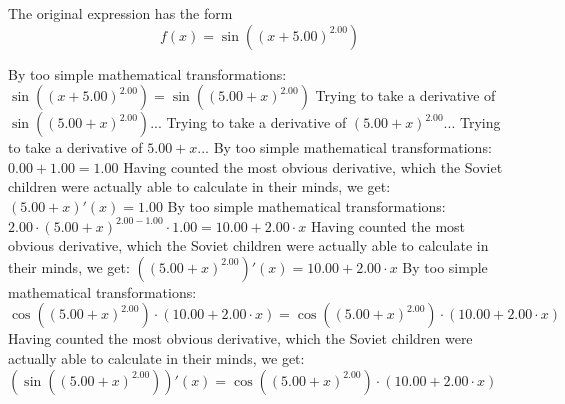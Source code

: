 \documentclass{article}
\begin{document}
                          
The original expression has the form \[f(x) =  \sin {\left({\left({{x} + {5.00}}\right) ^ {2.00}}\right)}  \]

By too simple mathematical transformations:
 $ \sin {\left({\left({{x} + {5.00}}\right) ^ {2.00}}\right)}  =  \sin {\left({\left({{5.00} + {x}}\right) ^ {2.00}}\right)} $ 
 \newline
 \newline 
Trying to take a derivative of $ \sin {\left({\left({{5.00} + {x}}\right) ^ {2.00}}\right)} $...\newline
\newline
Trying to take a derivative of ${\left({{5.00} + {x}}\right) ^ {2.00}}$...\newline
\newline
Trying to take a derivative of ${{5.00} + {x}}$...\newline
\newline
By too simple mathematical transformations:
 ${{0.00} + {1.00}} = {1.00}$ 
 \newline
 \newline 
Having counted the most obvious derivative, which the Soviet children were actually able to calculate in their minds, we get:
$({{5.00} + {x}})'(x) = {1.00}$\newline
\newline
By too simple mathematical transformations:
 ${{{2.00} \cdot {\left({{5.00} + {x}}\right) ^ {{2.00} - {1.00}}}} \cdot {1.00}} = {{10.00} + {{2.00} \cdot {x}}}$ 
 \newline
 \newline 
Having counted the most obvious derivative, which the Soviet children were actually able to calculate in their minds, we get:
$({\left({{5.00} + {x}}\right) ^ {2.00}})'(x) = {{10.00} + {{2.00} \cdot {x}}}$\newline
\newline
By too simple mathematical transformations:
 ${ \cos {\left({\left({{5.00} + {x}}\right) ^ {2.00}}\right)}  \cdot \left({{10.00} + {{2.00} \cdot {x}}}\right)} = { \cos {\left({\left({{5.00} + {x}}\right) ^ {2.00}}\right)}  \cdot \left({{10.00} + {{2.00} \cdot {x}}}\right)}$ 
 \newline
 \newline 
Having counted the most obvious derivative, which the Soviet children were actually able to calculate in their minds, we get:
$( \sin {\left({\left({{5.00} + {x}}\right) ^ {2.00}}\right)} )'(x) = { \cos {\left({\left({{5.00} + {x}}\right) ^ {2.00}}\right)}  \cdot \left({{10.00} + {{2.00} \cdot {x}}}\right)}$\newline
\end{document}
